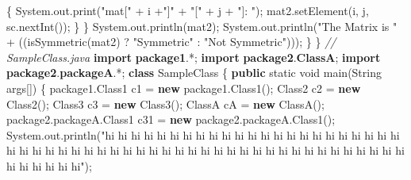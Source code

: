 \documentclass[
  12pt,
]{article}
\newenvironment{Shaded}{}{}
\newcommand{\BuiltInTok}[1]{\textcolor[rgb]{0.00,0.50,0.00}{#1}}
\newcommand{\CommentTok}[1]{\textcolor[rgb]{0.38,0.63,0.69}{\textit{#1}}}
\newcommand{\DataTypeTok}[1]{\textcolor[rgb]{0.56,0.13,0.00}{#1}}
\newcommand{\FunctionTok}[1]{\textcolor[rgb]{0.02,0.16,0.49}{#1}}
\newcommand{\ImportTok}[1]{\textcolor[rgb]{0.00,0.50,0.00}{\textbf{#1}}}
\newcommand{\KeywordTok}[1]{\textcolor[rgb]{0.00,0.44,0.13}{\textbf{#1}}}
\newcommand{\NormalTok}[1]{#1}
\newcommand{\OperatorTok}[1]{\textcolor[rgb]{0.40,0.40,0.40}{#1}}
\newcommand{\StringTok}[1]{\textcolor[rgb]{0.25,0.44,0.63}{#1}}
\begin{document}
\begin{Shaded}
\begin{Highlighting}[numbers=left,,]
            \OperatorTok{\{}
                \BuiltInTok{System}\OperatorTok{.}\FunctionTok{out}\OperatorTok{.}\FunctionTok{print}\OperatorTok{(}\StringTok{"mat["} \OperatorTok{+}\NormalTok{ i }\OperatorTok{+}\StringTok{"]"} \OperatorTok{+} \StringTok{"["} \OperatorTok{+}\NormalTok{ j }\OperatorTok{+} \StringTok{"]: "}\OperatorTok{);}
\NormalTok{                mat2}\OperatorTok{.}\FunctionTok{setElement}\OperatorTok{(}\NormalTok{i}\OperatorTok{,}\NormalTok{ j}\OperatorTok{,}\NormalTok{ sc}\OperatorTok{.}\FunctionTok{nextInt}\OperatorTok{());}
            \OperatorTok{\}}
        \OperatorTok{\}}
        \BuiltInTok{System}\OperatorTok{.}\FunctionTok{out}\OperatorTok{.}\FunctionTok{println}\OperatorTok{(}\NormalTok{mat2}\OperatorTok{);}
        \BuiltInTok{System}\OperatorTok{.}\FunctionTok{out}\OperatorTok{.}\FunctionTok{println}\OperatorTok{(}\StringTok{"The Matrix is "} \OperatorTok{+} \OperatorTok{((}\FunctionTok{isSymmetric}\OperatorTok{(}\NormalTok{mat2}\OperatorTok{)} \OperatorTok{?} \StringTok{"Symmetric"} \OperatorTok{:} \StringTok{"Not Symmetric"}\OperatorTok{)));}
    \OperatorTok{\}}
\OperatorTok{\}}
    \CommentTok{// SampleClass.java}
    \KeywordTok{import} \ImportTok{package1}\OperatorTok{.*;}
    \KeywordTok{import} \ImportTok{package2}\OperatorTok{.}\ImportTok{ClassA}\OperatorTok{;}
    \KeywordTok{import} \ImportTok{package2}\OperatorTok{.}\ImportTok{packageA}\OperatorTok{.*;}
    \KeywordTok{class}\NormalTok{ SampleClass}
    \OperatorTok{\{}
        \KeywordTok{public} \DataTypeTok{static} \DataTypeTok{void} \FunctionTok{main}\OperatorTok{(}\BuiltInTok{String}\NormalTok{ args}\OperatorTok{[])}
        \OperatorTok{\{}
\NormalTok{            package1}\OperatorTok{.}\FunctionTok{Class1}\NormalTok{ c1 }\OperatorTok{=} \KeywordTok{new}\NormalTok{ package1}\OperatorTok{.}\FunctionTok{Class1}\OperatorTok{();}
\NormalTok{            Class2 c2 }\OperatorTok{=} \KeywordTok{new} \FunctionTok{Class2}\OperatorTok{();}
\NormalTok{            Class3 c3 }\OperatorTok{=} \KeywordTok{new} \FunctionTok{Class3}\OperatorTok{();}
\NormalTok{            ClassA cA }\OperatorTok{=} \KeywordTok{new} \FunctionTok{ClassA}\OperatorTok{();}
\NormalTok{            package2}\OperatorTok{.}\FunctionTok{packageA}\OperatorTok{.}\FunctionTok{Class1}\NormalTok{ c31 }\OperatorTok{=} \KeywordTok{new}\NormalTok{ package2}\OperatorTok{.}\FunctionTok{packageA}\OperatorTok{.}\FunctionTok{Class1}\OperatorTok{();}
            \BuiltInTok{System}\OperatorTok{.}\FunctionTok{out}\OperatorTok{.}\FunctionTok{println}\OperatorTok{(}\StringTok{"hi hi hi hi hi hi hi hi hi hi hi hi hi hi hi hi hi hi hi hi hi hi hi hi hi hi hi hi hi hi hi hi hi hi hi hi hi hi hi hi hi hi hi hi hi hi hi hi hi hi hi hi hi hi hi hi hi hi hi hi"}\OperatorTok{);}

\end{Highlighting}
\end{Shaded}
\end{document}
